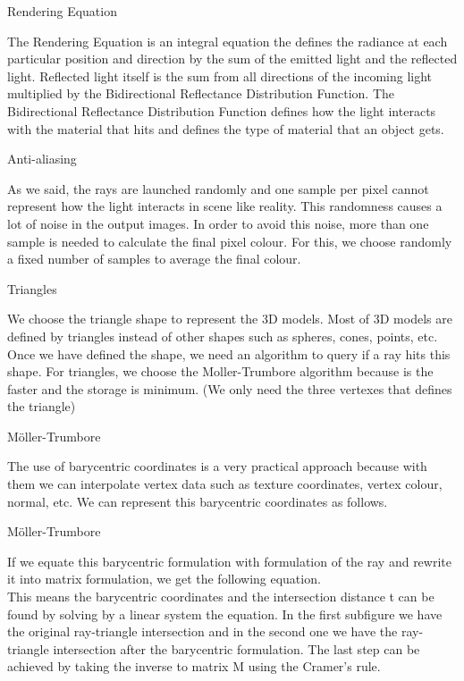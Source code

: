 \documentclass{beamer}
\begin{document}
\begin{frame}{Rendering Equation}

The Rendering Equation is an integral equation the defines the radiance at each particular position and direction by the sum of the emitted light and the reflected light. Reflected light itself is the sum from all directions of the incoming light multiplied by the Bidirectional Reflectance Distribution Function. The Bidirectional Reflectance Distribution Function defines how the light interacts with the material that hits and defines the type of material that an object gets.

\end{frame}


\begin{frame}{Anti-aliasing}

As we said, the rays are launched randomly and one sample per pixel cannot represent how the light interacts in scene like reality. This randomness causes a lot of noise in the output images. In order to avoid this noise, more than one sample is needed to calculate the final pixel colour. For this, we choose randomly a fixed number of samples to average the final colour.

\end{frame}


\begin{frame}{Triangles}

We choose the triangle shape to represent the 3D models. Most of 3D models are defined by triangles instead of other shapes such as spheres, cones, points, etc. Once we have defined the shape, we need an algorithm to query if a ray hits this shape. For triangles, we choose the Moller-Trumbore algorithm because is the faster and the storage is minimum. (We only need the three vertexes that defines the triangle)

\end{frame}

\begin{frame}{Möller-Trumbore}

The use of barycentric coordinates is a very practical approach because with them we can interpolate vertex data such as texture coordinates, vertex colour, normal, etc. We can represent this barycentric coordinates as follows.

\end{frame}

\begin{frame}{Möller-Trumbore}

If we equate this barycentric formulation with formulation of the ray and rewrite it into matrix formulation, we get the following equation. \\

This means the barycentric coordinates and the intersection distance t can be found by solving by a linear system the equation. In the first subfigure we have the original ray-triangle intersection and in the second one we have the ray-triangle intersection after the barycentric formulation. The last step can be achieved by taking the inverse to matrix M using the Cramer’s rule.

\end{frame}
\end{document}
